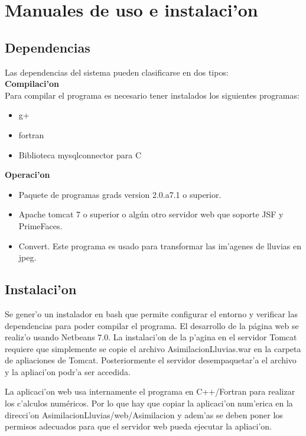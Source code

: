 \chapter{Manuales de uso e instalaci'on}

\section{Dependencias}
Las dependencias del sistema pueden clasificarse en dos tipos:\\
\textbf{Compilaci'on} 
\\
Para compilar el programa es necesario tener instalados los siguientes programas:
\begin{itemize}
 \item g+
  \item fortran
  \item Biblioteca mysqlconnector para C  
\end{itemize}

\textbf{Operaci'on} 

\begin{itemize}
 \item Paquete de programas grads version 2.0.a7.1 o superior.
  \item Apache tomcat 7 o superior o algún otro servidor web que soporte JSF y PrimeFaces.
  \item Convert. Este programa es usado para transformar las im'agenes de lluvias en jpeg.
\end{itemize}

\section{Instalaci'on}
Se gener'o un instalador en bash que permite configurar el entorno y verificar las dependencias para poder compilar
el programa.
El desarrollo de la página web se realiz'o usando Netbeans 7.0. La instalaci'on de la p'agina en el servidor Tomcat requiere que
simplemente se copie el archivo AsimilacionLluvias.war en la carpeta de apliaciones de Tomcat. Posteriormente el servidor 
desempaquetar'a el archivo y la apliaci'on podr'a ser accedida.

La aplicaci'on web usa internamente el programa en C++/Fortran para realizar los c'alculos numéricos. Por lo que hay que copiar
la aplicaci'on num'erica en la direcci'on AsimilacionLluvias/web/Asimilacion y adem'as se deben poner los permisos adecuados para
que el servidor web pueda ejecutar la apliaci'on.

